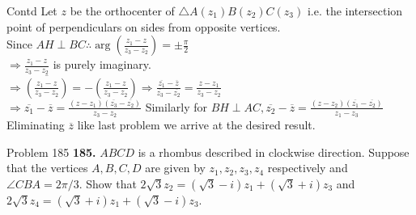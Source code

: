\documentclass[aspectratio=169,8pt]{beamer}
\begin{document}
\begin{frame}{Contd}
  Let $z$ be the orthocenter of $\triangle A(z_1)B(z_2)C(z_3)$ i.e. the intersection point of perpendiculars on sides from opposite
  vertices.\\
  \vspace*{0.2cm}
  Since $AH\perp BC \therefore \arg\left(\frac{z_1 - z}{z_3 - z_2}\right) = \pm\frac{\pi}{2}$\\
  \vspace*{0.2cm}
  $\Rightarrow \frac{z_1 - z}{z_3 - z_2}$ is purely imaginary.\\
  \vspace*{0.2cm}
  $\Rightarrow \overline{\left(\frac{z_1 - z}{z_3 - z_2}\right)} = -\left(\frac{z_1 - z}{z_3 - z_2}\right)\Rightarrow
  \frac{\overline{z_1} - \overline{z}}{\overline{z_3} - \overline{z_2}} = \frac{z - z_1}{z_3 - z_2}$\\
  \vspace*{0.2cm}
  $\Rightarrow \overline{z_1} - \overline{z} = \frac{(z - z_1)(\overline{z_3} - \overline{z_2})}{z_3 - z_2}$
  \vspace*{0.2cm}
  Similarly for $BH\perp AC, \overline{z_2} - \overline{z} = \frac{(z - z_2)(\overline{z_1} - \overline{z_2})}{z_1 - z_3}$\\
  \vspace*{0.2cm}
  Eliminating $\overline{z}$ like last problem we arrive at the desired result.
\end{frame}
\begin{frame}{Problem 185}
  \textbf{185.} $ABCD$ is a rhombus described in clockwise direction. Suppose that the vertices $A, B, C, D$ are given by $z_1,
  z_2, z_3, z_4$ respectively and $\angle CBA = 2\pi/3$. Show that $2\sqrt{3}z_2 = (\sqrt{3} - i)z_1 + (\sqrt{3} + i)z_3$ and
  $2\sqrt{3}z_4 = (\sqrt{3} + i)z_1 + (\sqrt{3} - i)z_3$.
\end{frame}
\end{document}
